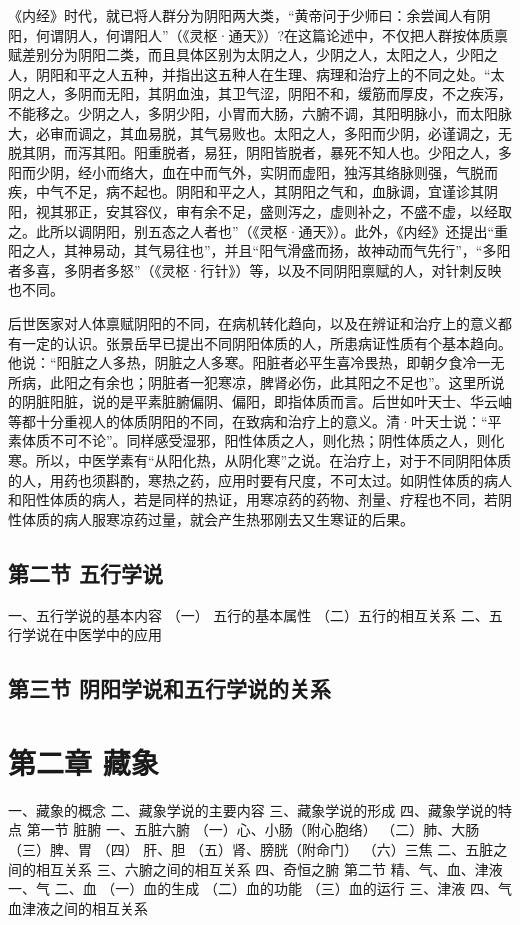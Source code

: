 \documentclass[a4paper,12pt,UTF8,twoside]{ctexbook}
\begin{document}
《内经》时代，就已将人群分为阴阳两大类，“黄帝问于少师曰：余尝闻人有阴阳，何谓阴人，何谓阳人”（《灵枢·通天》）?在这篇论述中，不仅把人群按体质禀赋差别分为阴阳二类，而且具体区别为太阴之人，少阴之人，太阳之人，少阳之人，阴阳和平之人五种，并指出这五种人在生理、病理和治疗上的不同之处。“太阴之人，多阴而无阳，其阴血浊，其卫气涩，阴阳不和，缓筋而厚皮，不之疾泻，不能移之。少阴之人，多阴少阳，小胃而大肠，六腑不调，其阳明脉小，而太阳脉大，必审而调之，其血易脱，其气易败也。太阳之人，多阳而少阴，必谨调之，无脱其阴，而泻其阳。阳重脱者，易狂，阴阳皆脱者，暴死不知人也。少阳之人，多阳而少阴，经小而络大，血在中而气外，实阴而虚阳，独泻其络脉则强，气脱而疾，中气不足，病不起也。阴阳和平之人，其阴阳之气和，血脉调，宜谨诊其阴阳，视其邪正，安其容仪，审有余不足，盛则泻之，虚则补之，不盛不虚，以经取之。此所以调阴阳，别五态之人者也”（《灵枢·通天》）。此外，《内经》还提出“重阳之人，其神易动，其气易往也”，并且“阳气滑盛而扬，故神动而气先行”，“多阳者多喜，多阴者多怒”（《灵枢·行针》）等，以及不同阴阳禀赋的人，对针刺反映也不同。

后世医家对人体禀赋阴阳的不同，在病机转化趋向，以及在辨证和治疗上的意义都有一定的认识。张景岳早已提出不同阴阳体质的人，所患病证性质有个基本趋向。他说：“阳脏之人多热，阴脏之人多寒。阳脏者必平生喜冷畏热，即朝夕食冷一无所病，此阳之有余也；阴脏者一犯寒凉，脾肾必伤，此其阳之不足也”。这里所说的阴脏阳脏，说的是平素脏腑偏阴、偏阳，即指体质而言。后世如叶天士、华云岫等都十分重视人的体质阴阳的不同，在致病和治疗上的意义。清·叶天士说：“平素体质不可不论”。同样感受湿邪，阳性体质之人，则化热；阴性体质之人，则化寒。所以，中医学素有“从阳化热，从阴化寒”之说。在治疗上，对于不同阴阳体质的人，用药也须斟酌，寒热之药，应用时要有尺度，不可太过。如阴性体质的病人和阳性体质的病人，若是同样的热证，用寒凉药的药物、剂量、疗程也不同，若阴性体质的病人服寒凉药过量，就会产生热邪刚去又生寒证的后果。

\section{第二节 五行学说}
一、五行学说的基本内容
（一） 五行的基本属性
（二）五行的相互关系
二、五行学说在中医学中的应用
\section{第三节 阴阳学说和五行学说的关系}

\chapter{第二章 藏象}
一、藏象的概念
二、藏象学说的主要内容
三、藏象学说的形成
四、藏象学说的特点
第一节 脏腑
一、五脏六腑
（一）心、小肠（附心胞络）
（二）肺、大肠
（三）脾、胃
（四） 肝、胆
（五）肾、膀胱（附命门）
（六）三焦
二、五脏之间的相互关系
三、六腑之间的相互关系
四、奇恒之腑
第二节 精、气、血、津液
一、气
二、血
（一）血的生成
（二）血的功能
（三）血的运行
三、津液
四、气血津液之间的相互关系
\end{document}
